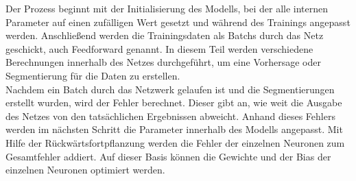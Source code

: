 Der Prozess beginnt mit der Initialisierung des \gls{Modell}s, bei der alle internen Parameter auf einen zufälligen Wert gesetzt und während des Trainings angepasst werden. Anschließend werden die Trainingsdaten als \glspl{Batch} durch das Netz geschickt, auch Feedforward genannt. In diesem Teil werden verschiedene Berechnungen innerhalb des Netzes durchgeführt, um eine Vorhersage oder Segmentierung für die Daten zu erstellen.\\

Nachdem ein \gls{Batch} durch das Netzwerk gelaufen ist und die Segmentierungen erstellt wurden, wird der Fehler berechnet. Dieser gibt an, wie weit die Ausgabe des Netzes von den tatsächlichen Ergebnissen abweicht. Anhand dieses Fehlers werden im nächsten Schritt die Parameter innerhalb des \gls{Modell}s angepasst. Mit Hilfe der Rückwärtsfortpflanzung werden die Fehler der einzelnen Neuronen zum Gesamtfehler addiert. Auf dieser Basis können die Gewichte und der Bias der einzelnen Neuronen optimiert werden. \cite[vgl.][]{Goodfellow2016}